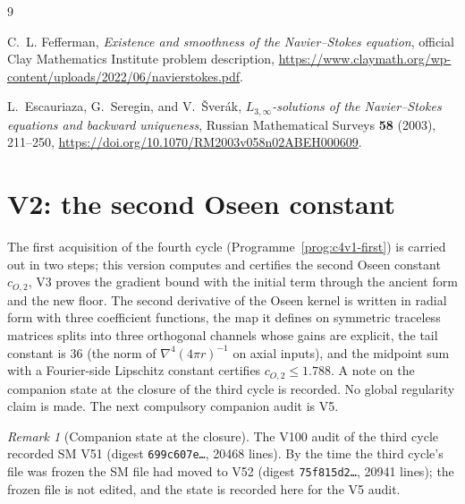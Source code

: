 \documentclass[11pt]{article}
\theoremstyle{plain}
\theoremstyle{definition}
\theoremstyle{remark}
\newtheorem{remark}[theorem]{Remark}
\begin{document}
\begin{thebibliography}{9}

C.~L. Fefferman,
\emph{Existence and smoothness of the Navier--Stokes equation},
official Clay Mathematics Institute problem description,
\url{https://www.claymath.org/wp-content/uploads/2022/06/navierstokes.pdf}.

L.~Escauriaza, G.~Seregin, and V.~\v Sver\'ak,
\emph{$L_{3,\infty}$-solutions of the Navier--Stokes equations and backward
uniqueness}, Russian Mathematical Surveys \textbf{58} (2003), 211--250,
\url{https://doi.org/10.1070/RM2003v058n02ABEH000609}.

\end{thebibliography}

\section{V2: the second Oseen constant}
\label{sec:c4v2-entry}

The first acquisition of the fourth cycle (Programme~\ref{prog:c4v1-first})
is carried out in two steps; this version computes and certifies
the second Oseen constant \(c_{O,2}\), V3 proves the gradient bound with
the initial term through the ancient form and the new floor.  The
second derivative of the Oseen kernel is written in radial form
with three coefficient functions, the map it defines on symmetric
traceless matrices splits into three orthogonal channels whose gains
are explicit, the tail constant is \(36\) (the norm of \(\nabla^4(4\pi r)^{-1}\) on
axial inputs), and the midpoint sum with a Fourier-side Lipschitz
constant certifies \(c_{O,2}\le1.788\).  A note on the companion state at
the closure of the third cycle is recorded.  No global regularity
claim is made.  The next compulsory companion audit is V5.

\begin{remark}[Companion state at the closure]
\label{rem:c4v2-companion}
The V100 audit of the third cycle recorded SM V51 (digest
\texttt{699c607e\dots}, 20468 lines).  By the time the third cycle's file
was frozen the SM file had moved to V52 (digest \texttt{75f815d2\dots},
20941 lines); the frozen file is not edited, and the state is
recorded here for the V5 audit.
\end{remark}

\end{document}
